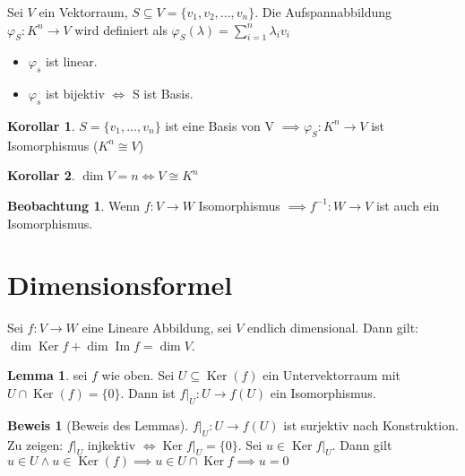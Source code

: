 \documentclass[oneside,fontsize=11pt,paper=a4,BCOR=0mm,DIV=12,automark,headsepline]{scrbook}
\DeclareMathOperator{\mdim}{dim}
\DeclareMathOperator{\mKer}{Ker}
\DeclareMathOperator{\mIm}{Im}
\theoremstyle{remark}
\theoremstyle{definition}
\newtheorem{beobachtung}{Beobachtung}
\newtheorem{lemma}{Lemma}[section]
\newtheorem*{korollar}{Korollar}
\theoremstyle{definition}
\newtheorem*{prof}{Beweis}
\theoremstyle{remark}
\begin{document}
\begin{exa}
Sei \(V\) ein Vektorraum, \(S\subseteq V = \{v_1, v_2, ..., v_n\}\). Die
Aufspannabbildung $\varphi_S: K^n \rightarrow V$ wird definiert als $\varphi_S(\lambda)=\sum_{i=1}^{n}\lambda_i v_i$

\begin{itemize}
	\item \(\varphi_s\) ist linear.
	\item \(\varphi_s\) ist bijektiv \(\iff\) S ist Basis.
\end{itemize}
\end{exa}

\begin{korollar}
	\(S=\{v_1,\ldots,v_n\}\) ist eine Basis von V $\implies \varphi_S: K^n \rightarrow V$ ist Isomorphismus ($K^n\cong V$)
\end{korollar}

\begin{korollar}
	\(\dim V = n \iff V\cong K^n\)
\end{korollar}

\begin{beobachtung}
	Wenn \(f:V\rightarrow W\) Isomorphismus $\implies f^{-1}:W\rightarrow V $ ist auch ein Isomorphismus.
\end{beobachtung}

\section{Dimensionsformel}
\label{sec:org9a58004}
\begin{theo}{}{}
Sei \(f:V\to W\) eine Lineare Abbildung, sei \(V\) endlich dimensional. Dann gilt: \(\mdim\mKer f + \mdim\mIm f = \mdim V\).
\end{theo}

\begin{lemma} sei \(f\) wie oben. Sei \(U \subseteq \mKer(f)\) ein Untervektorraum mit \(U \cap \mKer(f) = \{0\}\).  Dann ist \(f|_U:U\to f(U)\) ein Isomorphismus.
\end{lemma}

\begin{prof}[Beweis des Lemmas]
\(f|_U:U\to f(U)\) ist surjektiv nach Konstruktion. Zu zeigen: \(f|_U\) injkektiv \(\iff \mKer f|_U = \{0\}\). Sei \(u\in \mKer f|_U \). Dann gilt \(u\in U \land u \in \mKer(f) \implies u \in U \cap \mKer f \implies u = 0\)
\end{prof}
\end{document}
